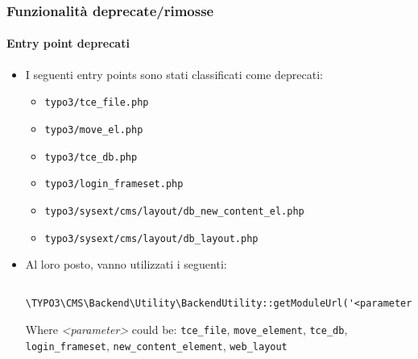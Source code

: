 \begin{frame}[fragile]
	\frametitle{Funzionalità deprecate/rimosse}
	\framesubtitle{Entry point deprecati}

	\begin{itemize}
		\item I seguenti entry points sono stati classificati come deprecati:

			\begin{itemize}
				\item \texttt{typo3/tce\_file.php}
				\item \texttt{typo3/move\_el.php}
				\item \texttt{typo3/tce\_db.php}
				\item \texttt{typo3/login\_frameset.php}
				\item \texttt{typo3/sysext/cms/layout/db\_new\_content\_el.php}
				\item \texttt{typo3/sysext/cms/layout/db\_layout.php}
			\end{itemize}

		\item Al loro posto, vanno utilizzati i seguenti:
			\begin{lstlisting}
				\TYPO3\CMS\Backend\Utility\BackendUtility::getModuleUrl('<parameter>')
			\end{lstlisting}

			Where \textit{<parameter>} could be:\newline
				\small
					\texttt{tce\_file}, \texttt{move\_element}, \texttt{tce\_db},
					\texttt{login\_frameset}, \texttt{new\_content\_element}, \texttt{web\_layout}
				\normalsize
	\end{itemize}

\end{frame}


